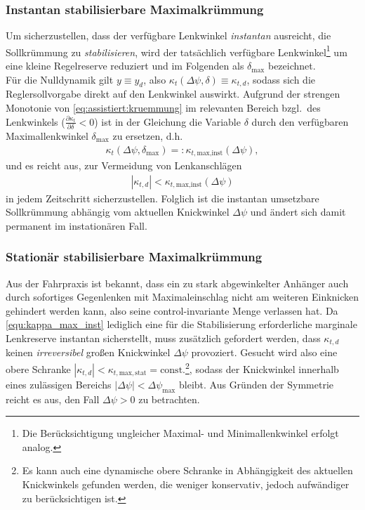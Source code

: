 \subsubsection{Instantan stabilisierbare Maximalkrümmung}
Um sicherzustellen, dass der verfügbare Lenkwinkel \emph{instantan} ausreicht, die Sollkrümmung zu \emph{stabilisieren}, wird der tatsächlich verfügbare Lenkwinkel\footnote{Die Berücksichtigung ungleicher Maximal- und Minimallenkwinkel erfolgt analog.} um eine kleine Regelreserve reduziert und im Folgenden als $\delta_\text{max}$ bezeichnet. \\
Für die Nulldynamik gilt $y \equiv y_d$, also $\kappa_{t}(\Delta\psi, \delta) \equiv \kappa_{t,d}$, sodass sich die Reglersollvorgabe direkt auf den Lenkwinkel auswirkt.
Aufgrund der strengen Monotonie von \eqref{eq:assistiert:kruemmung} im relevanten Bereich bzgl.\ des Lenkwinkels ($\tfrac{\partial \kappa_t}{\partial\delta}<0$) ist in der Gleichung die Variable $\delta$ durch den verfügbaren Maximallenkwinkel $\delta_\text{max}$ zu ersetzen, d.h.\
\begin{align*}
	\kappa_t(\Delta\psi, \delta_\text{max})=:\kappa_{t,\text{max,inst}}(\Delta\psi),
\end{align*}
 und es reicht aus, zur Vermeidung von Lenkanschlägen
\begin{align} \label{equ:kappa_max_inst}
	|\kappa_{t,d}| < \kappa_{t,\text{max,inst}}(\Delta\psi)
\end{align}
in jedem Zeitschritt sicherzustellen. Folglich ist die instantan umsetzbare Sollkrümmung abhängig vom aktuellen Knickwinkel $\Delta\psi$ und ändert sich damit permanent im instationären Fall.

\subsubsection{Stationär stabilisierbare Maximalkrümmung}
Aus der Fahrpraxis ist bekannt, dass ein zu stark abgewinkelter Anhänger auch durch sofortiges Gegenlenken mit Maximaleinschlag nicht am weiteren Einknicken gehindert werden kann, also seine control-invariante Menge verlassen hat. Da \eqref{equ:kappa_max_inst} lediglich eine für die Stabilisierung erforderliche marginale Lenkreserve instantan sicherstellt, muss zusätzlich gefordert werden, dass $\kappa_{t,d}$ keinen \emph{irreversibel} großen Knickwinkel $\Delta\psi$ provoziert. Gesucht wird also eine obere Schranke $|\kappa_{t,d}|<\kappa_{t,\text{max},\text{stat}}=\text{const.}$\footnote{Es kann auch eine dynamische obere Schranke in Abhängigkeit des aktuellen Knickwinkels gefunden werden, die weniger konservativ, jedoch aufwändiger zu berücksichtigen ist.}, sodass der Knickwinkel innerhalb eines zulässigen Bereichs $|\Delta\psi| < \Delta\psi_\text{max}$ bleibt. Aus Gründen der Symmetrie reicht es aus, den Fall $ \Delta\psi > 0$ zu betrachten.

